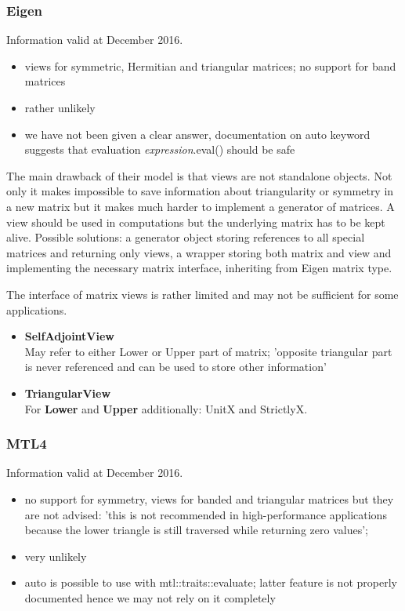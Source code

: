 \documentclass{article}
\begin{document}
\subsubsection{Eigen}
Information valid at December 2016. \\
\begin{itemize}
\item views for symmetric, Hermitian and triangular matrices\cite{eigenViewSymm}\cite{eigenViewTriang}; no support for band matrices\cite{eigenBand}
\item rather unlikely\cite{eigenEval}
\item we have not been given a clear answer\cite{eigenEval}, documentation on auto keyword suggests that evaluation \textit{expression}.eval() should be safe
\end{itemize}

The main drawback of their model is that views are not standalone objects. Not only it makes impossible to save information about triangularity or symmetry in a new matrix but it makes much harder to implement a generator of matrices. A view should be used in computations but the underlying matrix has to be kept alive. Possible solutions: a generator object storing references to all special matrices and returning only views, a wrapper storing both matrix and view and implementing the necessary matrix interface, inheriting from Eigen matrix type.

The interface of matrix views is rather limited and may not be sufficient for some applications.
\begin{itemize}
\item \textbf{SelfAdjointView} \\
May refer to either Lower or Upper part of matrix; 'opposite triangular part is never referenced and can be used to store other information'
\item \textbf{TriangularView} \\
For \textbf{Lower} and \textbf{Upper} additionally: UnitX and StrictlyX. 
\end{itemize}

\subsubsection{MTL4}
Information valid at December 2016. \\
\begin{itemize}
\item no support for symmetry, views for banded and triangular matrices\cite{mtlView} but they are not advised: 'this is not recommended in high-performance applications because the lower triangle is still traversed while returning zero values'; 
\item very unlikely
\item auto is possible to use\cite{mtlAuto} with mtl::traits::evaluate; latter feature is not properly documented hence we may not rely on it completely
\end{itemize}
\end{document}
